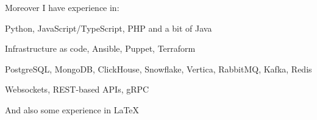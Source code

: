 Moreover I have experience in:
\begin{bulist}
  \item Python, JavaScript/TypeScript, PHP and a bit of Java
  \item Infrastructure as code, Ansible, Puppet, Terraform
  \item PostgreSQL, MongoDB, ClickHouse, Snowflake, Vertica, RabbitMQ, Kafka,
    Redis
  \item Websockets, REST-based APIs, gRPC
\end{bulist}
And also some experience in \LaTeX
